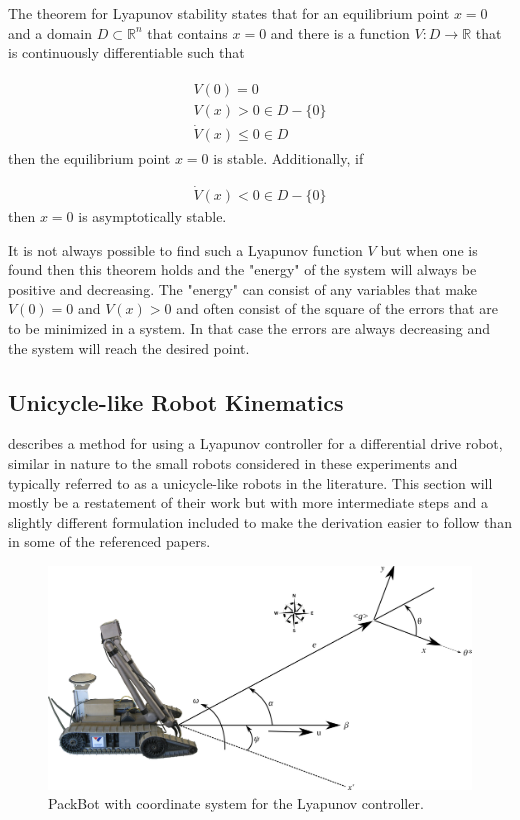 The theorem for Lyapunov stability states that for an equilibrium point $x=0$ and a domain $D\subset\mathbb{R}^n$ that contains $x=0$ and there is a function $V:D\to\mathbb{R}$ that is continuously differentiable such that

\begin{align}
\label{eq:lyapunovTheorem}
\begin{split}
V(0) = 0 \\
V(x) > 0 \in D-\{0\} \\
\dot{V}(x) \leq 0 \in D
\end{split}
\end{align}
then the equilibrium point $x=0$ is stable. Additionally, if

\begin{align}
\label{eq:lyapunovAsymptoticStability}
\dot{V}(x) < 0 \in D - \{0\}
\end{align}
then $x=0$ is asymptotically stable.

It is not always possible to find such a Lyapunov function $V$ but when one is found then this theorem holds and the "energy" of the system will always be positive and decreasing. The "energy" can consist of any variables that make $V(0) = 0$ and $V(x) > 0$ and often consist of the square of the errors that are to be minimized in a system. In that case the errors are always decreasing and the system will reach the desired point.

\subsection{Unicycle-like Robot Kinematics}
\label{sec:unicycleKinematics}
\cite{Rusu05RobotuxLyapunov,Aicardi_UnicycleLyapunov95} describes a method for using a Lyapunov controller for a differential drive robot, similar in nature to the small robots considered in these experiments and typically referred to as a unicycle-like robots in the literature. This section will mostly be a restatement of their work but with more intermediate steps and a slightly different formulation included to make the derivation easier to follow than in some of the referenced papers.

\begin{figure}[ht!]
	\centering
	\includegraphics[width=.95\textwidth]{images/packbotlyapunov}
	\caption{PackBot with coordinate system for the Lyapunov controller.}
	\label{fig:pblyapunov}
\end{figure}

